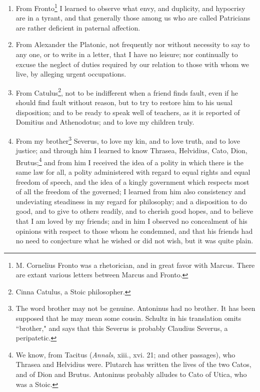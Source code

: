 \begin{enumerate}
\item From Fronto\footnote{M. Cornelius Fronto was a rhetorician, and in great favor with Marcus. There are extant various letters between Marcus and Fronto.} I learned to observe what envy, and duplicity, and hypocrisy are in a tyrant, and that generally those among us who are called Patricians are rather deficient in paternal affection. 

\item From Alexander the Platonic, not frequently nor without necessity to say to any one, or to write in a letter, that I have no leisure; nor continually to excuse the neglect of duties required by our relation to those with whom we live, by alleging urgent occupations. 

\item From Catulus\footnote{Cinna Catulus, a Stoic philosopher.}, not to be indifferent when a friend finds fault, even if he should find fault without reason, but to try to restore him to his usual disposition; and to be ready to speak well of teachers, as it is reported of Domitius and Athenodotus; and to love my children truly. 

\item From my brother\footnote{The word brother may not be genuine. Antoninus had no brother. It has been supposed that he may mean some cousin. Schultz in his translation omits ``brother," and says that this Severus is probably Claudius Severus, a peripatetic.} Severus, to love my kin, and to love truth, and to love justice; and through him I learned to know Thrasea, Helvidius, Cato, Dion, Brutus;\footnote{We know, from Tacitus (\textit{Annals}, xiii., xvi. 21; and other passages), who Thrasea and Helvidius were. Plutarch has written the lives of the two Catos, and of Dion and Brutus. Antoninus probably alludes to Cato of Utica, who was a Stoic.} and from him I received the idea of a polity in which there is the same law for all, a polity administered with regard to equal rights and equal freedom of speech, and the idea of a kingly government which respects most of all the freedom of the governed; I learned from him also consistency and undeviating steadiness in my regard for philosophy; and a disposition to do good, and to give to others readily, and to cherish good hopes, and to believe that I am loved by my friends; and in him I observed no concealment of his opinions with respect to those whom he condemned, and that his friends had no need to conjecture what he wished or did not wish, but it was quite plain. 


\end{enumerate}
